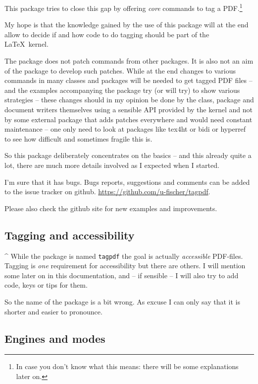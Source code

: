 \documentclass[DIV=12,parskip=half-,bibliography=totoc]{scrartcl}
\newcommand\PDF{PDF}
\begin{document}
\TagP This package tries to close this gap by offering \emph{core} commands to tag a \PDF{}.\footnote{In case you don't know what this means: there will be some explanations later on.}

\TagP My hope is that the knowledge gained by the use of this package will at the end allow to decide if and how code to do tagging should be part of the \LaTeX\ kernel.

\TagP The package does not patch commands from other packages. It is also not an aim of the package to develop such patches. While at the end changes to various commands in many classes and packages will be needed to get tagged \PDF{} files -- and the examples accompanying the package try (or will try) to show various strategies -- these changes should in my opinion be done by the class, package and document writers themselves using a sensible API provided by the kernel and not by some external package that adds patches everywhere and would need constant maintenance -- one only need to look at packages like tex4ht or bidi or hyperref to see how difficult and sometimes fragile this is.

\TagP So this package deliberately concentrates on the basics -- and this already quite a lot, there are much more details involved as I expected when I started.

\TagP I'm sure that it has bugs. Bugs reports, suggestions and comments can be added to the issue tracker on github. \url{https://github.com/u-fischer/tagpdf}.

\TagP Please also check the github site for new examples and improvements.
\TagPend

\subsection{Tagging and accessibility}

\TagP^ While the package is named \texttt{tagpdf} the goal is actually \emph{accessible} \PDF{}-files. Tagging is \emph{one} requirement for accessibility but there are others. I will mention some later on in this documentation, and -- if sensible -- I will also try to add code, keys or tips for them.

\TagP So the name of the package is a bit wrong. As excuse I can only say that it is shorter and easier to pronounce.
\TagPend

\subsection{Engines and modes}
\end{document}
